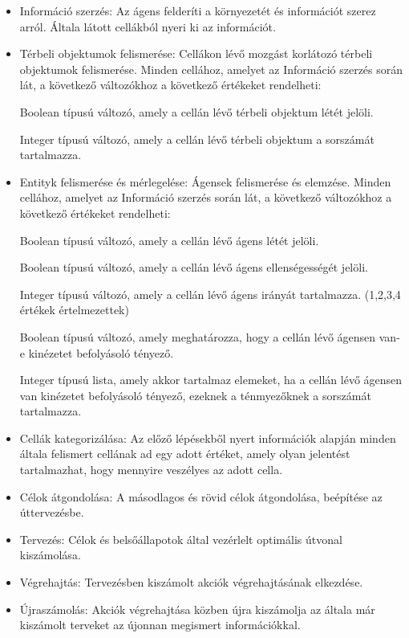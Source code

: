 \begin{itemize}
    \item Információ szerzés:
    Az ágens felderíti a környezetét és információt szerez arról. Általa látott cellákból nyeri ki az információt.
    \item Térbeli objektumok felismerése:
    Cellákon lévő mozgást korlátozó térbeli objektumok felismerése. Minden cellához, amelyet az Információ szerzés során lát, a következő változókhoz a következő értékeket rendelheti:
    
    Boolean típusú változó, amely a cellán lévő térbeli objektum létét jelöli.
    
    Integer típusú változó, amely a cellán lévő térbeli objektum a sorszámát tartalmazza.

    \item Entityk felismerése és mérlegelése:
    Ágensek felismerése és elemzése.
    Minden cellához, amelyet az Információ szerzés során lát, a következő változókhoz a következő értékeket rendelheti:

    Boolean típusú változó, amely a cellán lévő ágens létét jelöli.

    Boolean típusú változó, amely a cellán lévő ágens ellenségességét jelöli.

    Integer típusú változó, amely a cellán lévő ágens irányát tartalmazza. (1,2,3,4 értékek értelmezettek)

    Boolean típusú változó, amely meghatározza, hogy a cellán lévő ágensen van-e kinézetet befolyásoló tényező.

    Integer típusú lista, amely akkor tartalmaz elemeket, ha a cellán lévő ágensen van kinézetet befolyásoló tényező, ezeknek a ténmyezőknek a sorszámát tartalmazza.

    \item Cellák kategorizálása:
    Az előző lépésekből nyert információk alapján minden általa felismert cellának ad egy adott értéket, amely olyan jelentést tartalmazhat, hogy mennyire veszélyes az adott cella.
    \item Célok átgondolása:
    A másodlagos és rövid célok átgondolása, beépítése az úttervezésbe.
    \item Tervezés:
    Célok és belsőállapotok által vezérlelt optimális útvonal kiszámolása.
    \item Végrehajtás: 
    Tervezésben kiszámolt akciók végrehajtásának elkezdése.
    \item Újraszámolás:
    Akciók végrehajtása közben újra kiszámolja az általa már kiszámolt terveket az újonnan megismert információkkal.
\end{itemize}

